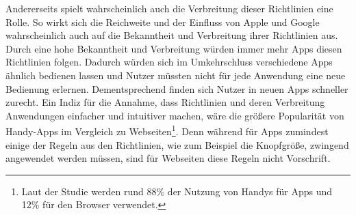		Andererseits spielt wahrscheinlich auch die Verbreitung dieser Richtlinien eine Rolle. So wirkt sich die Reichweite und der Einfluss von Apple und Google wahrscheinlich auch auf die Bekanntheit und Verbreitung ihrer Richtlinien aus. %
		Durch eine hohe Bekanntheit und Verbreitung würden immer mehr Apps diesen Richtlinien folgen. %
		Dadurch würden sich im Umkehrschluss verschiedene Apps ähnlich bedienen lassen und Nutzer müssten nicht für jede Anwendung eine neue Bedienung erlernen. Dementsprechend finden sich Nutzer in neuen Apps schneller zurecht.\newline%
		Ein Indiz für die Annahme, dass Richtlinien und deren Verbreitung Anwendungen einfacher und intuitiver machen, wäre die größere Popularität von Handy-Apps im Vergleich zu Webseiten\cite{pcVsphone_mobileAppVsWebTimeSpent}\footnote{Laut der Studie werden rund 88\% der Nutzung von Handys für Apps und 12\% für den Browser verwendet.}. Denn während für Apps zumindest einige der Regeln aus den Richtlinien, wie zum Beispiel die Knopfgröße, zwingend angewendet werden müssen\cite{konventionen_buttonSize}, sind für Webseiten diese Regeln nicht Vorschrift.%
%
%
%
%
%
%
%	
